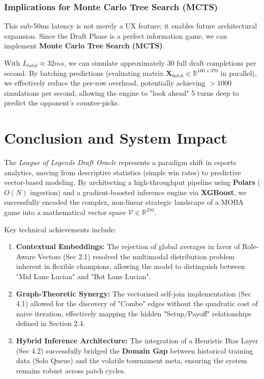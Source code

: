\documentclass[12pt, a4paper]{article}
\begin{document}
    \subsubsection{Implications for Monte Carlo Tree Search (MCTS)}
    This sub-50ms latency is not merely a UX feature; it enables future architectural expansion.
    Since the Draft Phase is a perfect information game, we can implement \textbf{Monte Carlo Tree Search (MCTS)}.

    With $L_{total} \approx 32ms$, we can simulate approximately 30 full draft completions per second. By batching predictions (evaluating matrix $\mathbf{X}_{batch} \in \mathbb{R}^{160 \times 370}$ in parallel), we effectively reduce the per-row overhead, potentially achieving $>1000$ simulations per second, allowing the engine to "look ahead" 5 turns deep to predict the opponent's counter-picks.

    \newpage

    \section{Conclusion and System Impact}

    The \textit{League of Legends Draft Oracle} represents a paradigm shift in esports analytics, moving from descriptive statistics (simple win rates) to predictive vector-based modeling. By architecting a high-throughput pipeline using \textbf{Polars} ($O(N)$ ingestion) and a gradient-boosted inference engine via \textbf{XGBoost}, we successfully encoded the complex, non-linear strategic landscape of a MOBA game into a mathematical vector space $\mathcal{V} \in \mathbb{R}^{370}$.

    Key technical achievements include:
    \begin{enumerate}
        \item \textbf{Contextual Embeddings:} The rejection of global averages in favor of Role-Aware Vectors (Sec 2.1) resolved the multimodal distribution problem inherent in flexible champions, allowing the model to distinguish between "Mid Lane Lucian" and "Bot Lane Lucian".
        \item \textbf{Graph-Theoretic Synergy:} The vectorized self-join implementation (Sec 4.1) allowed for the discovery of "Combo" edges without the quadratic cost of naive iteration, effectively mapping the hidden "Setup/Payoff" relationships defined in Section 2.4.
        \item \textbf{Hybrid Inference Architecture:} The integration of a Heuristic Bias Layer (Sec 4.2) successfully bridged the \textbf{Domain Gap} between historical training data (Solo Queue) and the volatile tournament meta, ensuring the system remains robust across patch cycles.
    \end{enumerate}
\end{document}

